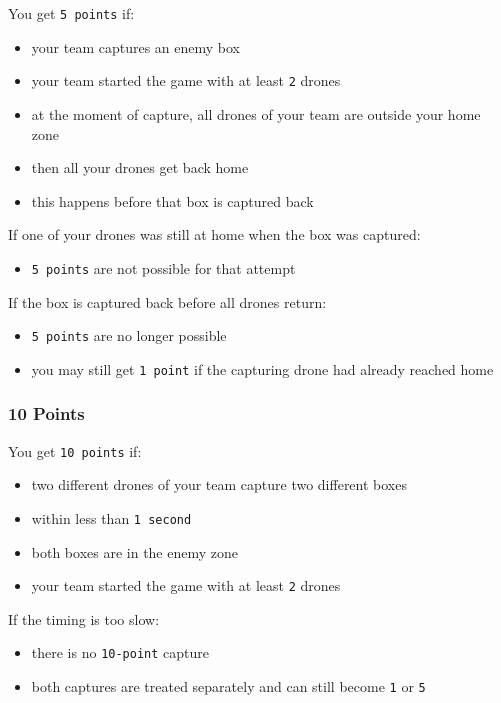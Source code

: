 You get \texttt{5 points} if:
\begin{itemize}
    \item your team captures an enemy box
    \item your team started the game with at least \texttt{2} drones
    \item at the moment of capture, all drones of your team are outside your home zone
    \item then all your drones get back home
    \item this happens before that box is captured back
\end{itemize}

If one of your drones was still at home when the box was captured:
\begin{itemize}
    \item \texttt{5 points} are not possible for that attempt
\end{itemize}

If the box is captured back before all drones return:
\begin{itemize}
    \item \texttt{5 points} are no longer possible
    \item you may still get \texttt{1 point} if the capturing drone had already reached home
\end{itemize}

\subsubsection{10 Points}

You get \texttt{10 points} if:
\begin{itemize}
    \item two different drones of your team capture two different boxes
    \item within less than \texttt{1 second}
    \item both boxes are in the enemy zone
    \item your team started the game with at least \texttt{2} drones
\end{itemize}

If the timing is too slow:
\begin{itemize}
    \item there is no \texttt{10-point} capture
    \item both captures are treated separately and can still become \texttt{1} or \texttt{5}
\end{itemize}

